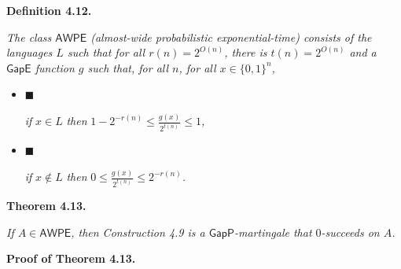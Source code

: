 \documentclass[10pt,a4paper]{article}
\begin{document}


\par\medskip\noindent\textbf{
\textbf{Definition 4.12}\textbf{.}
}\par



\emph{The class $\mathsf{AWPE}$ (almost-wide probabilistic exponential-time) consists of
the languages $L$ such that for all $r(n)=2^{O(n)}$, there is $t(n)=2^{O(n)}$ and a $\mathsf{GapE}$
function $g$ such that, for all $n$, for all $x\in\{0,1\}^{n}$,}\par


\begin{itemize}


\item[] 
$\blacksquare$ 


\emph{if }$x\in L$\emph{ then }$1-2^{-r(n)}\leq\frac{g(x)}{2^{t(n)}}\leq 1$\emph{,}\par





\item[] 
$\blacksquare$ 


\emph{if }$x\not\in L$\emph{ then }$0\leq\frac{g(x)}{2^{t(n)}}\leq 2^{-r(n)}$\emph{.}\par





\end{itemize}








\par\medskip\noindent\textbf{
\textbf{Theorem 4.13}\textbf{.}
}\par



\emph{If $A\in\mathsf{AWPE}$, then Construction 4.9 is a $\mathsf{GapP}$-martingale that $0$-succeeds on $A$.}\par








\par\medskip\noindent\textbf{Proof of Theorem 4.13.}\par
\end{document}
